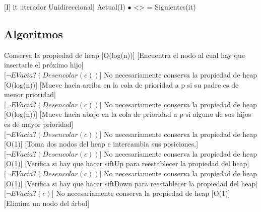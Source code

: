 \begin{Representacion}
[I]{ it :iterador Unidireccional| Actual(I) $\bullet$ <> = Siguientes(it)}

\subsection{Algoritmos}


{Conserva la propiedad de heap}
[O(log(n))]
[Encuentra el nodo al cual hay que insertarle el próximo hijo]\\

[$\neg EVacia?(Desencolar(c))$]
{No necesariamente conserva la propiedad de heap}
[O(log(n))]
[Mueve hacia arriba en la cola de prioridad a p si su padre es de menor prioridad]\\

[$\neg EVacia?(Desencolar(c))$]
{No necesariamente conserva la propiedad de heap}
[O(log(n))]
[Mueve hacia abajo en la cola de prioridad a p si alguno de sus hijos es de mayor prioridad]\\

[$\neg EVacia?(Desencolar(c))$]
{No necesariamente conserva la propiedad de heap}
[O(1)]
[Toma dos nodos del heap e intercambia sus posiciones.]\\

[$\neg EVacia?(Desencolar(c))$]
{No necesariamente conserva la propiedad de heap}
[O(1)]
[Verifica si hay que hacer siftUp para reestablecer la propiedad del heap]\\

[$\neg EVacia?(Desencolar(c))$]
{No necesariamente conserva la propiedad de heap}
[O(1)]
[Verifica si hay que hacer siftDown para reestablecer la propiedad del heap]\\

[$\neg EVacia?(c)$]
{No necesariamente conserva la propiedad de heap}
[O(1)]
[Elimina un nodo del árbol]\\


\end{Representacion}
